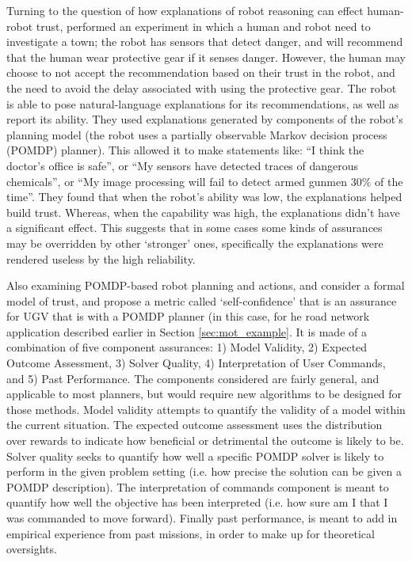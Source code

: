 Turning to the question of how explanations of robot reasoning can effect human-robot trust,  \citet{Wang2016-id} performed an experiment in which a human and robot need to investigate a town; the robot has sensors that detect danger, and will recommend that the human wear protective gear if it senses danger. However, the human may choose to not accept the recommendation based on their trust in the robot, and the need to avoid the delay associated with using the protective gear. The robot is able to pose natural-language explanations for its recommendations, as well as report its ability. They used explanations generated by components of the robot's planning model (the robot uses a partially observable Markov decision process (POMDP) planner). This allowed it to make statements like: ``I think the doctor's office is safe'', or ``My sensors have detected traces of dangerous chemicals'', or ``My image processing will fail to detect armed gunmen 30\% of the time''. They found that when the robot's ability was low, the explanations helped build trust. Whereas, when the capability was high, the explanations didn't have a significant effect. This suggests that in some cases some kinds of assurances may be overridden by other `stronger' ones, specifically the explanations were rendered useless by the high reliability. 

Also examining POMDP-based robot planning and actions, \citet{Aitken2016-fb} and \citet{Aitken2016-cv} consider a formal model of trust, and propose a metric called `self-confidence' that is an assurance for UGV that is with a  POMDP planner (in this case, for he road network application described earlier in Section \ref{sec:mot_example}. It is made of a combination of five component assurances: 1) Model Validity, 2) Expected Outcome Assessment, 3) Solver Quality, 4) Interpretation of User Commands, and 5) Past Performance. The components considered are fairly general, and applicable to most planners, but would require new algorithms to be designed for those methods. Model validity attempts to quantify the validity of a model within the current situation. The expected outcome assessment uses the distribution over rewards to indicate how beneficial or detrimental the outcome is likely to be. Solver quality seeks to quantify how well a specific POMDP solver is likely to perform in the given problem setting (i.e. how precise the solution can be given a POMDP description). The interpretation of commands component is meant to quantify how well the objective has been interpreted (i.e. how sure am I that I was commanded to move forward). Finally past performance, is meant to add in empirical experience from past missions, in order to make up for theoretical oversights.

